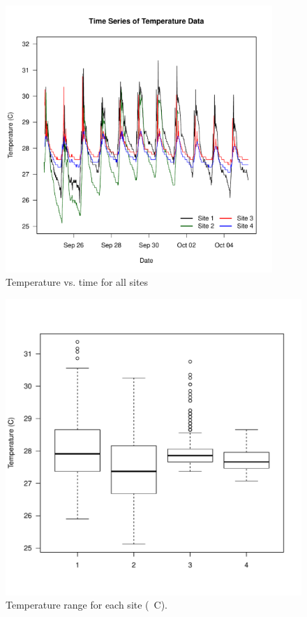 \documentclass{article}\usepackage[]{graphicx}\usepackage[]{color}
\makeatletter
\def\maxwidth{ %
  \ifdim\Gin@nat@width>\linewidth
    \linewidth
  \else
    \Gin@nat@width
  \fi
}
\newenvironment{knitrout}{}{} %
\makeatother
\begin{document}
\begin{figure}[!ht]
\includegraphics[width=0.90\textwidth]{Figures/Temp}
\caption{Temperature vs. time for all sites}
\label{fig:Temp}
\end{figure}
\begin{figure}
\begin{knitrout}
\color{fgcolor}
\includegraphics[width=\maxwidth]{figure/unnamed-chunk-4-1} 

\end{knitrout}
\label{fig:tempbox}
\caption{Temperature range for each site (\textdegree~C).}
\end{figure}
\end{document}
